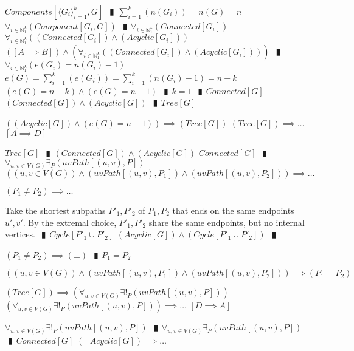 \documentclass{book}
\newcommand{\pipe}{$\phantom{(}\vrectangleblack\phantom{)}$}
\newcommand{\pr}[1]{\left(#1\right)}
\begin{document}
\begin{enumerate}
\begin{enumerate}
    \lit $Components[\langle G_i \rangle_{i = 1}^k, G]$ \pipe $\sum \limits_{i = 1}^k\pr{n(G_i)} = n(G) = n$
    \lit $\forall_{i \in \mathbb{N}_1^k}(Component[G_i, G])$ \pipe $\forall_{i \in \mathbb{N}_1^k}(Connected[G_i])$
    \lit $\forall_{i \in \mathbb{N}_1^k}\pr{(Connected[G_i]) \land (Acyclic[G_i])}$
    \lit $([A \implies B]) \land \pr{\forall_{i \in \mathbb{N}_1^k}\pr{(Connected[G_i]) \land (Acyclic[G_i])}}$ \pipe $\forall_{i \in \mathbb{N}_1^k}\pr{e(G_i) = n(G_i) - 1}$
    \lit $e(G) = \sum \limits_{i = 1}^k\pr{e(G_i)} = \sum \limits_{i = 1}^k\pr{n(G_i) - 1} = n - k$
    \lit $\pr{e(G) = n - k} \land \pr{e(G) = n - 1}$ \pipe $k = 1$ \pipe $Connected[G]$
    \lit $(Connected[G]) \land (Acyclic[G])$ \pipe $Tree[G]$
  \end{enumerate}
  \lit $\pr{(Acyclic[G]) \land \pr{e(G) = n - 1}} \implies (Tree[G])$
  \lit $(Tree[G]) \implies \ldots$    $[A \implies D]$
  \begin{enumerate}
    \lit $Tree[G]$ \pipe $(Connected[G]) \land (Acyclic[G])$
    \lit $Connected[G]$ \pipe $\forall_{u, v \in V(G)} \exists_{P}\pr{uvPath[(u, v), P]}$
    \lit $\pr{\pr{u, v \in V(G)} \land \pr{uvPath[(u, v), P_1]} \land \pr{uvPath[(u, v), P_2]}} \implies \ldots$
    \begin{enumerate}
      \lit $(P_1 \neq P_2) \implies \ldots$
      \begin{enumerate}
        \lit Take the shortest subpaths $P'_1, P'_2$ of $P_1, P_2$ that ends on the same endpoints $u', v'$.
        \lit By the extremal choice, $P'_1, P'_2$ share the same endpoints, but no internal vertices. \pipe $Cycle[P'_1 \cup P'_2]$
        \lit $(Acyclic[G]) \land (Cycle[P'_1 \cup P'_2])$ \pipe $\bot$
      \end{enumerate}
      \lit $(P_1 \neq P_2) \implies (\bot)$ \pipe $P_1 = P_2$
    \end{enumerate}
    \lit $\pr{\pr{u, v \in V(G)} \land \pr{uvPath[(u, v), P_1]} \land \pr{uvPath[(u, v), P_2]}} \implies (P_1 = P_2)$
  \end{enumerate}
  \lit $(Tree[G]) \implies \pr{\forall_{u, v \in V(G)} \exists!_{P}\pr{uvPath[(u, v), P]}}$
  \lit $\pr{\forall_{u, v \in V(G)} \exists!_{P}\pr{uvPath[(u, v), P]}} \implies \ldots$    $[D \implies A]$
  \begin{enumerate}
    \lit $\forall_{u, v \in V(G)} \exists!_{P}\pr{uvPath[(u, v), P]}$ \pipe $\forall_{u, v \in V(G)} \exists_{P}\pr{uvPath[(u, v), P]}$ \pipe $Connected[G]$
    \lit $(\lnot Acyclic[G]) \implies \ldots$
    \begin{enumerate}

\end{enumerate}
\end{enumerate}
\end{enumerate}
\end{document}
